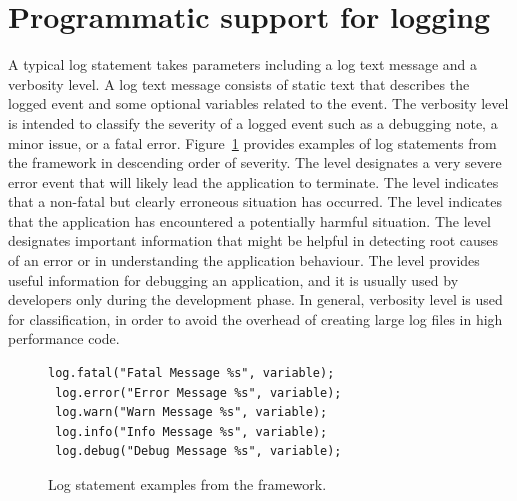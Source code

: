 \section{Programmatic support for logging} \label{background Logging}

A typical log statement takes parameters including a log text message and a verbosity level. A log text message consists of static text that describes the logged event and some optional variables related to the event. The verbosity level is intended to classify the severity of a logged event such as a debugging note, a minor issue, or a fatal error. Figure~\ref{fig:log-call-examples} provides examples of log statements from the  framework in descending order of severity. The  level designates a very severe error event that will likely lead the application to terminate. The  level indicates that a non-fatal but clearly erroneous situation has occurred. The  level indicates that the application has encountered a potentially harmful situation. The  level designates important information that might be helpful in detecting root causes of an error or in understanding the application behaviour. The  level provides useful information for debugging an application, and it is usually used by developers only during the development phase. In general, verbosity level is used for classification, in order to avoid the overhead of creating large log files in high performance code.

\begin{figure}[H]
\vspace*{1em}
\begin{center}
\begin{minipage}{3.5in}
\begin{lstlisting}[frame=single,numbers=none]
 log.fatal("Fatal Message %s", variable);
 log.error("Error Message %s", variable);
 log.warn("Warn Message %s", variable);
 log.info("Info Message %s", variable);
 log.debug("Debug Message %s", variable);
\end{lstlisting}
\end{minipage}
\caption{Log statement examples from the \protect{} framework.\label{fig:chap1_logCode}\label{fig:log-call-examples}}
\end{center}
\end{figure}

